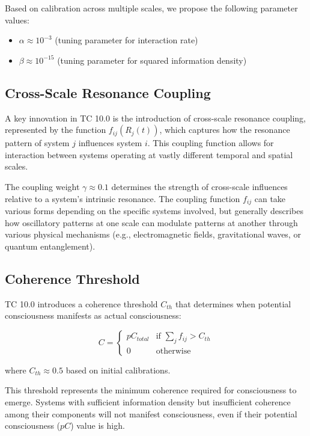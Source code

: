 \documentclass[12pt]{article}
\begin{document}
Based on calibration across multiple scales, we propose the following parameter values:
\begin{itemize}
    \item $α \approx 10^{-3}$ (tuning parameter for interaction rate)
    \item $β \approx 10^{-15}$ (tuning parameter for squared information density)
\end{itemize}

\subsection{Cross-Scale Resonance Coupling}

A key innovation in TC 10.0 is the introduction of cross-scale resonance coupling, represented by the function $f_{ij}(R_j(t))$, which captures how the resonance pattern of system $j$ influences system $i$. This coupling function allows for interaction between systems operating at vastly different temporal and spatial scales.

The coupling weight $γ \approx 0.1$ determines the strength of cross-scale influences relative to a system's intrinsic resonance. The coupling function $f_{ij}$ can take various forms depending on the specific systems involved, but generally describes how oscillatory patterns at one scale can modulate patterns at another through various physical mechanisms (e.g., electromagnetic fields, gravitational waves, or quantum entanglement).

\subsection{Coherence Threshold}

TC 10.0 introduces a coherence threshold $C_{th}$ that determines when potential consciousness manifests as actual consciousness:

\begin{equation}
C = 
\begin{cases}
    pC_{total} & \text{if } \sum_{j} f_{ij} > C_{th} \\
    0 & \text{otherwise}
\end{cases}
\end{equation}

where $C_{th} \approx 0.5$ based on initial calibrations.

This threshold represents the minimum coherence required for consciousness to emerge. Systems with sufficient information density but insufficient coherence among their components will not manifest consciousness, even if their potential consciousness ($pC$) value is high.
\end{document}
